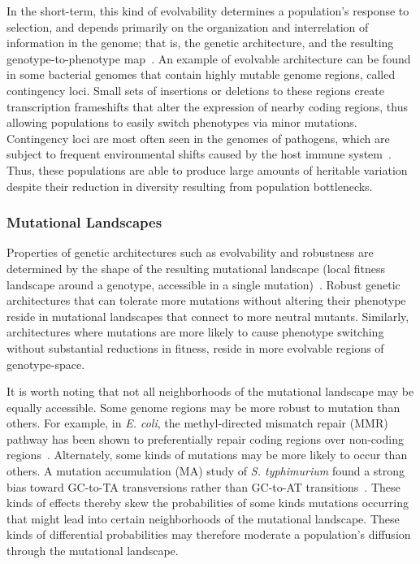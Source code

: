 \documentclass[10pt,letterpaper,final]{article}
\begin{document}
In the short-term, this kind of evolvability determines a population's response to selection, and depends primarily on the organization and interrelation of information in the genome; that is, the genetic architecture, and the resulting genotype-to-phenotype map~\cite{gunter_p._wagner_perspective:_1996}. An example of evolvable architecture can be found in some bacterial genomes that contain highly mutable genome regions, called contingency loci. Small sets of insertions or deletions to these regions create transcription frameshifts that alter the expression of nearby coding regions, thus allowing populations to easily switch phenotypes via minor mutations. Contingency loci are most often seen in the genomes of pathogens, which are subject to frequent environmental shifts caused by the host immune system~\cite{bayliss_simple_2001}. Thus, these populations are able to produce large amounts of heritable variation despite their reduction in diversity resulting from population bottlenecks.

\subsubsection*{Mutational Landscapes}
Properties of genetic architectures such as evolvability and robustness are determined by the shape of the resulting mutational landscape (local fitness landscape around a genotype, accessible in a single mutation)~\cite{andreas_wagner_robustness_2008}. Robust genetic architectures that can tolerate more mutations without altering their phenotype reside in mutational landscapes that connect to more neutral mutants. Similarly, architectures where mutations are more likely to cause phenotype switching without substantial reductions in fitness, reside in more evolvable regions of genotype-space.

It is worth noting that not all neighborhoods of the mutational landscape may be equally accessible. Some genome regions may be more robust to mutation than others. For example, in \textit{E. coli}, the methyl-directed mismatch repair (MMR) pathway has been shown to preferentially repair coding regions over non-coding regions~\cite{lee_rate_2012}. Alternately, some kinds of mutations may be more likely to occur than others. A mutation accumulation (MA) study of \textit{S. typhimurium} found a strong bias toward GC-to-TA transversions rather than GC-to-AT transitions~\cite{lind_whole-genome_2008}. These kinds of effects thereby skew the probabilities of some kinds mutations occurring that might lead into certain neighborhoods of the mutational landscape. These kinds of differential probabilities may therefore moderate a population's diffusion through the mutational landscape.
\end{document}
